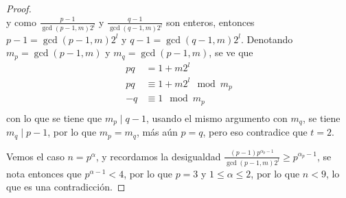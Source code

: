 \documentclass{ayudantia}
\begin{document}
\begin{proof}
\begin{equation*}
    \end{equation*}
    y como \(\frac{p-1}{\gcd(p-1,m)2^l}\) y \(\frac{q-1}{\gcd(q-1,m)2^l}\) son enteros, entonces \(p-1=\gcd(p-1,m)2^l\) y \(q-1=\gcd(q-1,m)2^l\). Denotando \(m_p=\gcd(p-1,m)\) y \(m_q=\gcd(p-1,m)\), se ve que
    \begin{align*}
        pq&=1+m2^l\\
        pq&\equiv 1+m2^l\mod m_p\\
        -q&\equiv 1\mod m_p\\
    \end{align*}
    con lo que se tiene que \(m_p\mid q-1\), usando el mismo argumento con \(m_q\), se tiene \(m_q\mid p-1\), por lo que \(m_p=m_q\), más aún \(p=q\), pero eso contradice que \(t=2\).

    Vemos el caso \(n=p^\alpha\), y recordamos la desigualdad \(\frac{(p-1)p^{\alpha_p-1}}{\gcd(p-1,m)2^l}\geq p^{\alpha_p-1}\), se nota entonces que \(p^{\alpha-1}<4\), por lo que \(p=3\) y \(1\leq\alpha\leq2\), por lo que \(n<9\), lo que es una contradicción.
\end{proof}
\end{document}
